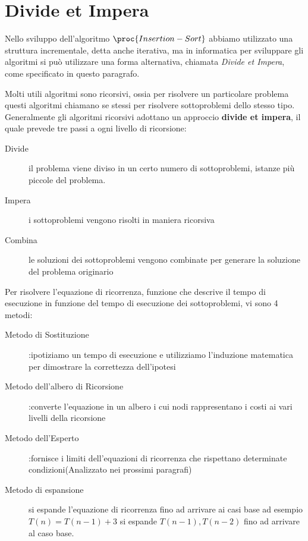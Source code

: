 \chapter{Divide et Impera}
Nello sviluppo dell'algoritmo $\proc{Insertion-Sort}$ abbiamo utilizzato una
struttura incrementale, detta anche iterativa, ma in informatica per sviluppare
gli algoritmi si può utilizzare una forma alternativa, chiamata \emph{Divide et Impera},
come specificato in questo paragrafo.

Molti utili algoritmi sono ricorsivi, ossia per risolvere un particolare problema
questi algoritmi chiamano se stessi per risolvere sottoproblemi dello stesso tipo.
Generalmente gli algoritmi ricorsivi adottano un approccio \textbf{divide et impera},
il quale prevede tre passi a ogni livello di ricorsione:
\begin{description}
    \item[Divide]il problema viene diviso in un certo numero di sottoproblemi, istanze
                  più piccole del problema.
    \item[Impera]i sottoproblemi vengono risolti in maniera ricorsiva
    \item[Combina]le soluzioni dei sottoproblemi vengono combinate per generare
                   la soluzione del problema originario
\end{description}


Per risolvere l'equazione di ricorrenza, funzione che descrive il tempo di esecuzione
in funzione del tempo di esecuzione dei sottoproblemi, vi sono 4 metodi:
\begin{description}
    \item[Metodo di Sostituzione]:ipotiziamo un tempo di esecuzione e utilizziamo
                l'induzione matematica per dimostrare la correttezza dell'ipotesi
    \item[Metodo dell'albero di Ricorsione]:converte l'equazione in un albero i cui
          nodi rappresentano i costi ai vari livelli della ricorsione
    \item[Metodo dell'Esperto]:fornisce i limiti dell'equazioni di ricorrenza che
          rispettano determinate condizioni(Analizzato nei prossimi paragrafi)
    \item[Metodo di espansione] si espande l'equazione di ricorrenza fino ad arrivare ai casi base
          ad esempio $T(n) = T(n-1) + 3$ si espande $T(n-1),T(n-2)$ fino ad arrivare al caso base.
\end{description}




